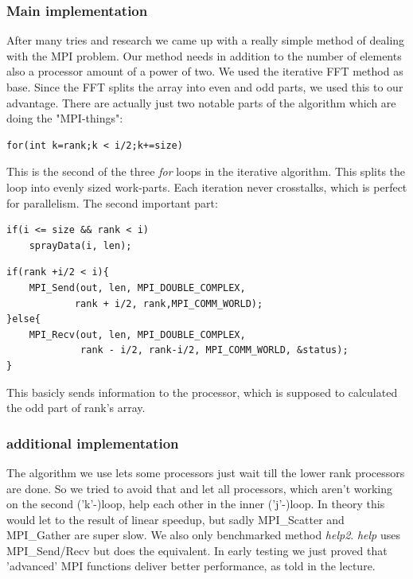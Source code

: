 	\subsubsection{Main implementation}
After many tries and research we came up with a really simple method of dealing with the MPI problem. Our method needs in addition to the number of elements also a processor amount of a power of two. We used the iterative FFT method as base. Since the FFT splits the array into even and odd parts, we used this to our advantage. There are actually just two notable parts of the algorithm which are doing the "MPI-things":
\begin{lstlisting}
for(int k=rank;k < i/2;k+=size)
\end{lstlisting}
This is the second of the three \textit{for} loops in the iterative algorithm. This splits the loop into evenly sized work-parts. Each iteration never crosstalks, which is perfect for parallelism.\newline
The second important part:
\begin{lstlisting}
if(i <= size && rank < i)
	sprayData(i, len);
\end{lstlisting}
\begin{lstlisting}
if(rank +i/2 < i){
	MPI_Send(out, len, MPI_DOUBLE_COMPLEX,
			rank + i/2, rank,MPI_COMM_WORLD);
}else{
	MPI_Recv(out, len, MPI_DOUBLE_COMPLEX,
			 rank - i/2, rank-i/2, MPI_COMM_WORLD, &status);
}
\end{lstlisting}
This basicly sends information to the processor, which is supposed to calculated the odd part of rank's array. 

\subsubsection{additional implementation}
The algorithm we use lets some processors just wait till the lower rank processors are done. So we tried to avoid that and let all processors, which aren't working on the second ('k'-)loop, help each other in the inner ('j'-)loop. In theory this would let to the result of linear speedup, but sadly MPI\_Scatter and MPI\_Gather are super slow. We also only benchmarked method \textit{help2}. \textit{help} uses MPI\_Send/Recv but does the equivalent. In early testing we just proved that 'advanced' MPI functions deliver better performance, as told in the lecture.

